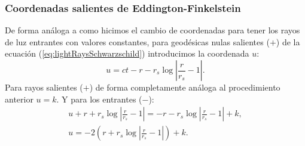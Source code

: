 \subsubsection{Coordenadas salientes de Eddington-Finkelstein}
De forma análoga a como hicimos el cambio de coordenadas para tener los rayos de luz entrantes con valores constantes, para geodésicas nulas salientes (\(+\)) de la ecuación (\ref{eq:lightRaysSchwarzschild}) introducimos la coordenada \( u \):
\begin{equation}
    u  = ct - r - r_s \log \left| \frac{r}{r_s} - 1 \right|.
\end{equation}
Para rayos salientes (\(+\)) de forma completamente análoga al procedimiento anterior \(u = k\).
Y para los entrantes (\(-\)):
\begin{equation}
    \begin{aligned}
        u + r + r_s \log \left| \frac{r}{r_s} - 1 \right| = -r - r_s \log \left| \frac{r}{r_s} - 1 \right| + k, \\
        u = -2\left(r + r_s \log \left| \frac{r}{r_s} - 1 \right|  \right) +k.
    \end{aligned}
\end{equation}
